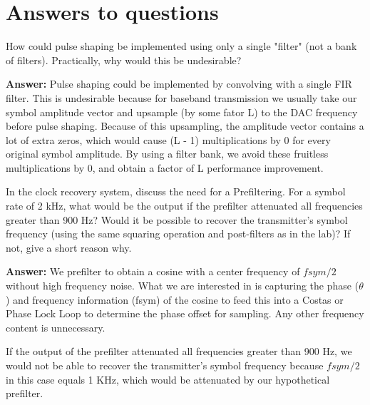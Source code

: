 \documentclass{article}
\begin{document}
\section{Answers to questions}

\begin{enumerate}
  \begin{item}
		How could pulse shaping be implemented using only a single "filter" (not a bank of filters). Practically, why would this be undesirable?

  \textbf{Answer:}
		Pulse shaping could be implemented by convolving with a single FIR filter. This is undesirable because for baseband transmission we usually take our symbol amplitude vector and upsample (by some fator L) to the DAC frequency before pulse shaping. Because of this upsampling, the amplitude vector contains a lot of extra zeros, which would cause (L - 1) multiplications by 0 for every original symbol amplitude. By using a filter bank, we avoid these
		fruitless multiplications by 0, and obtain a factor of L performance improvement.
  \end{item}

  \begin{item}
		In the clock recovery system, discuss the need for a Prefiltering. For a symbol rate of 2 kHz, what would be the output if the prefilter attenuated all frequencies greater than 900 Hz? Would it be possible to recover the transmitter's symbol frequency (using the same squaring operation and post-filters as in the lab)? If not, give a short reason why.

  \textbf{Answer:}
		We prefilter to obtain a cosine with a center frequency of $fsym/2$ without high frequency noise. What we are interested in is capturing the phase ($\theta$) and frequency information (fsym) of the cosine to feed this into a Costas or Phase Lock Loop to determine the phase offset for sampling. Any other frequency content is unnecessary.

		If the output of the prefilter attenuated all frequencies greater than 900 Hz, we would not be able to recover the transmitter's symbol frequency because $fsym/2$ in this case equals 1 KHz, which would be attenuated by our hypothetical prefilter.
  \end{item}

\end{enumerate}
\end{document}
